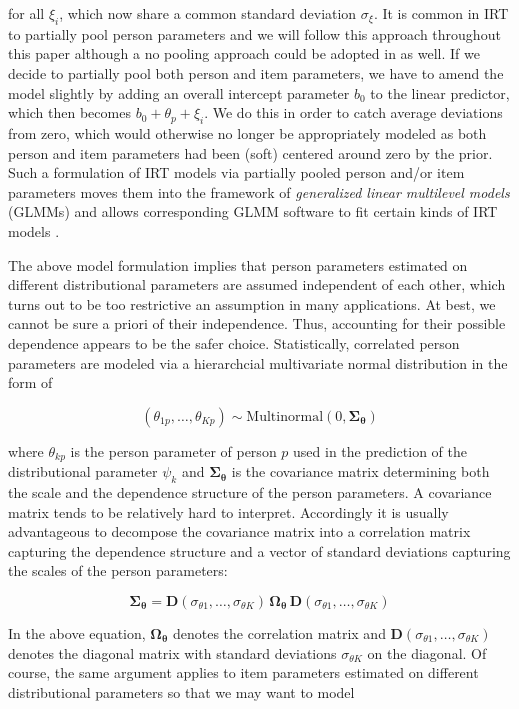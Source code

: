 \documentclass[jss]{jss}
\begin{document}
for all \(\xi_i\), which now share a common standard deviation
\(\sigma_\xi\). It is common in IRT to partially pool person parameters
\citep{deboeck2011} and we will follow this approach throughout this
paper although a no pooling approach could be adopted in  as
well. If we decide to partially pool both person and item parameters, we
have to amend the model slightly by adding an overall intercept
parameter \(b_0\) to the linear predictor, which then becomes
\(b_0 + \theta_p + \xi_i\). We do this in order to catch average
deviations from zero, which would otherwise no longer be appropriately
modeled as both person and item parameters had been (soft) centered
around zero by the prior. Such a formulation of IRT models via partially
pooled person and/or item parameters moves them into the framework of
\emph{generalized linear multilevel models} (GLMMs) and allows
corresponding GLMM software to fit certain kinds of IRT models
\citep{deboeck2011}.

The above model formulation implies that person parameters estimated on
different distributional parameters are assumed independent of each
other, which turns out to be too restrictive an assumption in many
applications. At best, we cannot be sure a priori of their independence.
Thus, accounting for their possible dependence appears to be the safer
choice. Statistically, correlated person parameters are modeled via a
hierarchcial multivariate normal distribution in the form of

\[
(\theta_{1p}, \ldots, \theta_{Kp}) \sim \text{Multinormal}(0, \mathbf{\Sigma_\theta})
\]

where \(\theta_{kp}\) is the person parameter of person \(p\) used in
the prediction of the distributional parameter \(\psi_k\) and
\(\mathbf{\Sigma_\theta}\) is the covariance matrix determining both the
scale and the dependence structure of the person parameters. A
covariance matrix tends to be relatively hard to interpret. Accordingly
it is usually advantageous to decompose the covariance matrix into a
correlation matrix capturing the dependence structure and a vector of
standard deviations capturing the scales of the person parameters:

\[
\mathbf{\Sigma_\theta} = \mathbf{D}(\sigma_{\theta 1}, \ldots, \sigma_{\theta K}) \, \mathbf{\Omega_\theta} \, \mathbf{D}(\sigma_{\theta 1}, \ldots, \sigma_{\theta K})
\]

In the above equation, \(\mathbf{\Omega_\theta}\) denotes the
correlation matrix and
\(\mathbf{D}(\sigma_{\theta 1}, \ldots, \sigma_{\theta K})\) denotes the
diagonal matrix with standard deviations \(\sigma_{\theta K}\) on the
diagonal. Of course, the same argument applies to item parameters
estimated on different distributional parameters so that we may want to
model
\end{document}
